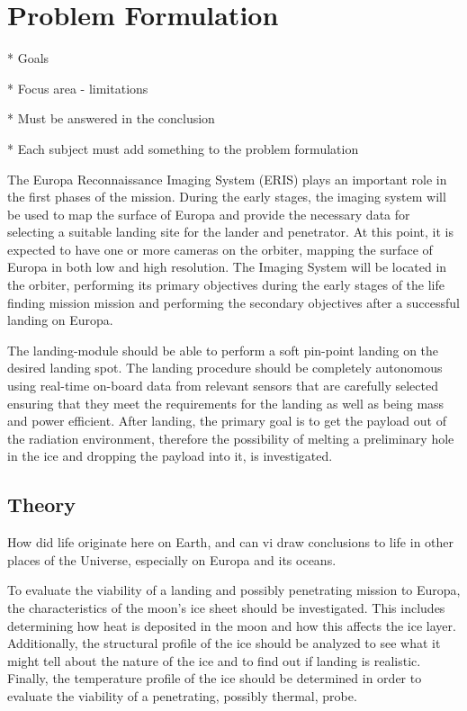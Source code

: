 \chapter{Problem Formulation}

* Goals

* Focus area - limitations

* Must be answered in the conclusion

* Each subject must add something to the problem formulation

The Europa Reconnaissance Imaging System (ERIS) plays an important role in the first phases of the mission. During the early stages, the imaging system will be used to map the surface of Europa and provide the necessary data for selecting a suitable landing site for the lander and penetrator. At this point, it is expected to have one or more cameras on the orbiter, mapping the surface of Europa in both low and high resolution. The Imaging System will be located in the orbiter, performing its primary objectives during the early stages of the life finding mission mission and performing the secondary objectives after a successful landing on Europa.

The landing-module should be able to perform a soft pin-point landing on the desired landing spot. The landing procedure should be completely autonomous using real-time on-board data from relevant sensors that are carefully selected ensuring that they meet the requirements for the landing as well as being mass and power efficient. After landing, the primary goal is to get the payload out of the radiation environment, therefore the possibility of melting a preliminary hole in the ice and dropping the payload into it, is investigated.

\section{Theory}
How did life originate here on Earth, and can vi draw conclusions to life in other places of the Universe, especially on Europa and its oceans.

To evaluate the viability of a landing and possibly penetrating mission to Europa, the characteristics of the moon's ice sheet should be investigated. This includes determining how heat is deposited in the moon and how this affects the ice layer. Additionally, the structural profile of the ice should be analyzed to see what it might tell about the nature of the ice and to find out if landing is realistic. Finally, the temperature profile of the ice should be determined in order to evaluate the viability of a penetrating, possibly thermal, probe.

